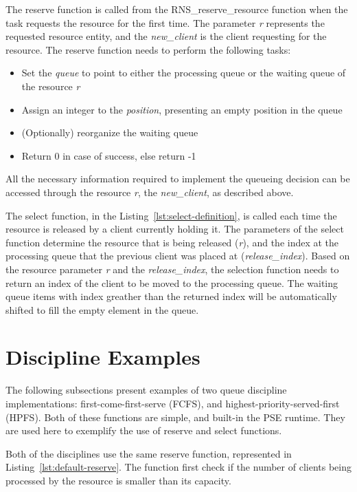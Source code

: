 The reserve function is called from the RNS\_reserve\_resource function when the task requests  the resource for the first time. The parameter \emph{r} represents the requested resource entity, and the \emph{new\_client} is the client requesting for the resource. The reserve function needs to perform the following tasks:

\begin{itemize}
\item Set the \emph{queue} to point to either the processing queue or the waiting queue of the resource \emph{r}
\item Assign an integer to the \emph{position}, presenting an empty position in the queue
\item (Optionally) reorganize the waiting queue
\item Return 0 in case of success, else return -1
\end{itemize}

All the necessary information required to implement the queueing decision can be accessed through the resource \emph{r}, the \emph{new\_client}, as described above.

The select function, in the Listing~\ref{lst:select-definition}, is called each time the resource is released by a client currently holding it. The parameters of the select function determine the resource that is being released (\emph{r}), and the index at the processing queue that the previous client was placed at (\emph{release\_index}). Based on the resource parameter \emph{r} and the \emph{release\_index}, the selection function needs to return an index of the client to be moved to the processing queue. The waiting queue items with index greather than the returned index will be automatically shifted to fill the empty element in the queue.



\section{Discipline Examples}
The following subsections present examples of two queue discipline implementations: first-come-first-serve (FCFS), and highest-priority-served-first (HPFS). Both of these functions are simple, and built-in the PSE runtime. They are used here to exemplify  the use of reserve and select functions.

Both of the disciplines use the same reserve function, represented in Listing~\ref{lst:default-reserve}. The function first check if the number of clients being processed by the resource is smaller than its capacity.

